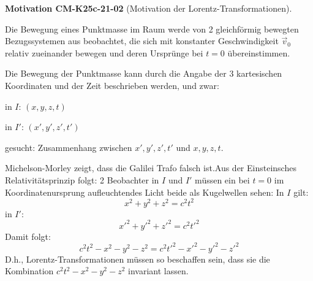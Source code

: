 \documentclass[10pt, letterpaper]{article}
\newcommand{\CustomHeading}[3]{%
  \par\medskip\noindent%
  \textbf{#1 #2} \textnormal{(#3)}.\enskip%
}
\newenvironment{MOT}[2]{\CustomHeading{Motivation}{#1}{#2}}{}
\begin{document}
\begin{MOT}{CM-K25c-21-02}{Motivation der Lorentz-Transformationen}
Die Bewegung eines Punktmasse im Raum werde von 2 gleichförmig bewegten Bezugssystemen aus beobachtet, die sich mit konstanter Geschwindigkeit $\vec{v}_0$ relativ zueinander bewegen und deren Ursprünge bei $t=0$ übereinstimmen.

\begin{center}
\end{center}

Die Bewegung der Punktmasse kann durch die Angabe der 3 kartesischen Koordinaten und der Zeit beschrieben werden, und zwar:

in $I$: $(x,y,z,t)$

in $I'$: $(x',y',z',t')$

gesucht: Zusammenhang zwischen $x',y',z',t'$ und $x,y,z,t$.

Michelson-Morley zeigt, dass die Galilei Trafo falsch ist.Aus der Einsteinsches Relativitätsprinzip folgt: 2 Beobachter in $I$ und $I'$ müssen ein bei $t=0$ im Koordinatenursprung aufleuchtendes Licht beide als Kugelwellen sehen: In $I$ gilt: 
$$x^2+y^2+z^2 = c^2t^2$$
in $I'$: 
$$x'^2+y'^2+z'^2 = c^2t'^2$$
Damit folgt:
$$c^2t^2 - x^2-y^2-z^2 = c^2t'^2 - x'^2-y'^2-z'^2$$
D.h., Lorentz-Transformationen müssen so beschaffen sein, dass sie die Kombination $c^2t^2-x^2-y^2-z^2$ invariant lassen.
\end{MOT}
\end{document}
